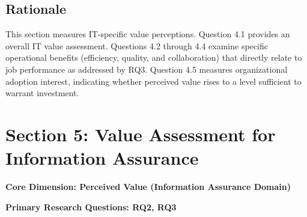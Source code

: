   \subsection{Rationale}

  This section measures IT-specific value perceptions. Question 4.1 provides an overall IT value assessment. Questions 4.2 through 4.4 examine specific operational benefits (efficiency, quality, and collaboration) that directly relate to job performance as addressed by RQ3. Question 4.5 measures organizational adoption interest, indicating whether perceived value rises to a level sufficient to warrant investment.

  \section{Section 5: Value Assessment for Information Assurance}

  \textbf{Core Dimension: Perceived Value (Information Assurance Domain)}

  \textbf{Primary Research Questions: RQ2, RQ3}

